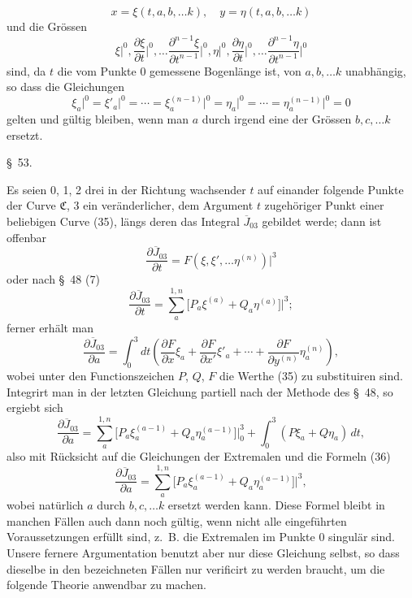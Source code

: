 \documentclass[11pt,a4paper,leqno]{article}
\begin{document}
\begin{equation}\tag{35}
x=\xi(t,a,b,\ldots k),\quad y=\eta(t,a,b,\ldots k)
\end{equation}
und die Grössen
\[
\xi\bigg|^0,\frac{\partial\xi}{\partial t}\bigg|^0,\ldots \frac{\partial^{n-1}\xi}{\partial t^{n-1}}\bigg|^0,
\eta\bigg|^0,\frac{\partial\eta}{\partial t}\bigg|^0,\ldots \frac{\partial^{n-1}\eta}{\partial t^{n-1}}\bigg|^0
\]
sind, da $t$ die vom Punkte 0 gemessene Bogenlänge ist, von $a,b,\ldots k$ unabhängig, so dass die Gleichungen
\begin{equation}\tag{36}
\xi_a\bigg|^0=\xi'_a\bigg|^0=\cdots=\xi_a^{(n-1)}\bigg|^0=
\eta_a\bigg|^0=\cdots=\eta_a^{(n-1)}\bigg|^0=0
\end{equation}
gelten und gültig bleiben, wenn man $a$ durch irgend eine der Grössen $b,c,\ldots k$ ersetzt.


\begin{center}
{\large \S~53.}
\end{center}

Es seien 0, 1, 2 drei in der Richtung wachsender $t$ auf einander folgende Punkte der Curve $\mathfrak{C}$, 3 ein veränderlicher, dem Argument $t$ zugehöriger Punkt einer beliebigen Curve (35), längs deren das Integral $\overline{J}_{03}$ gebildet werde; dann ist offenbar
\[
\frac{\partial\overline{J}_{03}}{\partial t}
=F(\xi,\xi',\ldots\eta^{(n)})\bigg|^3
\]
oder nach \S~48 (7)
\[
\frac{\partial\overline{J}_{03}}{\partial t}
=\sum_a^{1,n}\bigl[P_a\xi^{(a)}+Q_a\eta^{(a)}\bigr]\bigg|^3;
\]
ferner erhält man
\[
\frac{\partial\overline{J}_{03}}{\partial a}
=\int_0^3 dt\left(\frac{\partial F}{\partial x}\xi_a+
\frac{\partial F}{\partial x'}\xi'_a+\cdots+
\frac{\partial F}{\partial y^{(n)}}\eta_a^{(n)}\right),
\]
wobei unter den Functionszeichen $P$, $Q$, $F$ die Werthe (35) zu substituiren sind. Integrirt man in der letzten Gleichung partiell nach der Methode des \S~48, so ergiebt sich
\[
\frac{\partial\overline{J}_{03}}{\partial a}
=\sum_a^{1,n}\bigl[P_a\xi_a^{(a-1)}+Q_a\eta_a^{(a-1)}\bigr]\bigg|_0^3
+\int_0^3(P\xi_a+Q\eta_a)\,dt,
\]
also mit Rücksicht auf die Gleichungen der Extremalen und die Formeln (36)
\begin{equation}\tag{37}
\frac{\partial\overline{J}_{03}}{\partial a}
=\sum_a^{1,n}\bigl[P_a\xi_a^{(a-1)}+Q_a\eta_a^{(a-1)}\bigr]\bigg|^3,
\end{equation}
wobei natürlich $a$ durch $b,c,\ldots k$ ersetzt werden kann. Diese Formel bleibt in manchen Fällen auch dann noch gültig, wenn nicht alle eingeführten Voraussetzungen erfüllt sind, z.~B. die Extremalen im Punkte 0 singulär sind. Unsere fernere Argumentation benutzt aber nur diese Gleichung selbst, so dass dieselbe in den bezeichneten Fällen nur verificirt zu werden braucht, um die folgende Theorie anwendbar zu machen.
\end{document}
